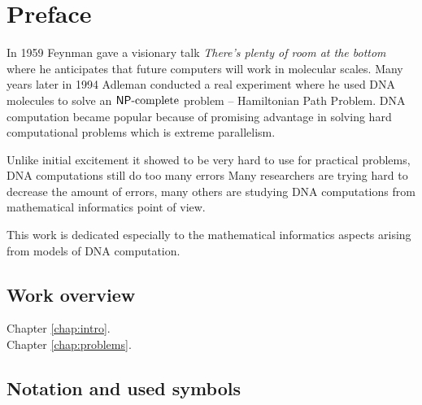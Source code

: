 \cleardoublepage{}   %
\chapter*{Preface}

In 1959 Feynman gave a visionary talk {\em There's plenty of room at the bottom} \cite{feynman} where he anticipates that future computers will work in molecular scales. Many years later in 1994 Adleman conducted a real experiment \cite{adleman94} where he used DNA molecules to solve an $\mathsf{NP}\textnormal{-complete}$ problem -- Hamiltonian Path Problem. DNA computation became popular because of promising advantage in solving hard computational problems which is extreme parallelism.

Unlike initial excitement it showed to be very hard to use for practical problems, DNA computations still do too many errors %
Many researchers are trying hard to decrease the amount of errors, many others are studying DNA computations from mathematical informatics point of view.

This work is dedicated especially to the mathematical informatics aspects arising from models of DNA computation.

\section*{Work overview}
	
	\begin{description}
		\item[Chapter \ref{chap:intro}.]
		\item[Chapter \ref{chap:problems}.]
	\end{description}

\section*{Notation and used symbols}
	
	
	
	
